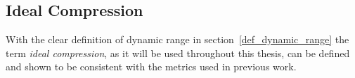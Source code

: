 \documentclass[../main2.tex]{subfiles}
\providecommand{\rootdir}{..}
\begin{document}
\FloatBarrier
\subsection{Ideal Compression}\label{method_ideal_peak_compression}
With the clear definition of dynamic range in section~\ref{def_dynamic_range} the term \emph{ideal compression}, as it will be used throughout this thesis, can be defined and shown to be consistent with the metrics used in previous work.





%
\end{document}
